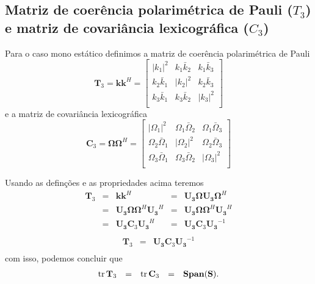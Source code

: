 \subsection{Matriz de coerência polarimétrica de Pauli ($T_3$) e matriz de covariância lexicográfica ($C_3$)}

Para o caso mono estático definimos a matriz de coerência polarimétrica de Pauli 
\begin{equation}\label{matriz_polar_pauli_3}
	\mathbf{T}_3=\mathbf{k}\mathbf{k}^H=	
\left[
\begin{array}{rrr}
	|k_1|^2       & k_1\bar{k}_2  & k_1\bar{k}_3  \\
	k_2\bar{k}_1  & |k_2|^2       & k_2\bar{k}_3  \\
	k_3\bar{k}_1  & k_3\bar{k}_2  &    |k_3|^2    \\
\end{array}
\right]
\end{equation}
e a matriz de covariância lexicográfica
\begin{equation}\label{matriz_covar_lexic_3}
	\mathbf{C}_3=\mathbf{\Omega}\mathbf{\Omega}^H=	
\left[
\begin{array}{rrr}
	|\Omega_1|^2       & \Omega_1\bar{\Omega}_2  & \Omega_1\bar{\Omega}_3   \\
	\Omega_2\bar{\Omega}_1  & |\Omega_2|^2       & \Omega_2\bar{\Omega}_3  \\
	\Omega_3\bar{\Omega}_1  & \Omega_3\bar{\Omega}_2  &    |\Omega_3|^2      \\
\end{array}
\right]
\end{equation}

Usando as definções e as propriedades acima teremos
\begin{equation}\nonumber
\begin{array}{rrrrr}
	\mathbf{T}_3&=&\mathbf{k}\mathbf{k}^H&=&\mathbf{U_3\Omega}\mathbf{U_3\Omega}^H	\\
	   &=&\mathbf{U_3\Omega}\mathbf{\Omega}^H\mathbf{U_3}^H&=&\mathbf{U_3}\mathbf{\Omega}\mathbf{\Omega}^H\mathbf{U_3}^H	\\
	   &=&\mathbf{U_3}\mathbf{C}_3\mathbf{U_3}^H&=&\mathbf{U_3}\mathbf{C}_3\mathbf{U_3}^{-1}\\
\end{array}
\end{equation}
\begin{equation}\label{matriz_simil_t4_c4}
\begin{array}{rrr}
	 \mathbf{T}_3  &=&\mathbf{U_3}\mathbf{C}_3\mathbf{U_3}^{-1}\\
\end{array}
\end{equation}
com isso, podemos concluir que
\begin{equation}\label{traco_t4_c4}
\begin{array}{rrrrr}
	\operatorname{tr}{\mathbf{T}_3}  &=&\operatorname{tr}{\mathbf{C}_3}&=&\mathbf{Span(S)}.\\
\end{array}
\end{equation}

